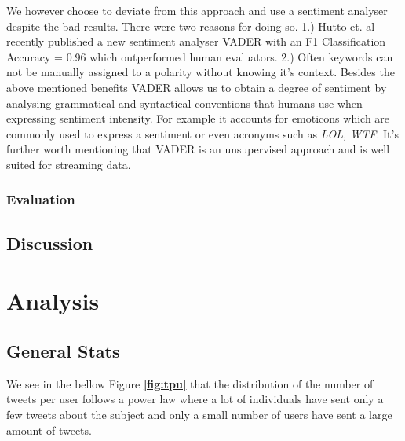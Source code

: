 \documentclass[12pt]{report}
\begin{document}
We however choose to deviate from this approach and use a sentiment analyser despite the bad results. There were two reasons for doing so. 1.) Hutto et. al recently published a new sentiment analyser VADER \cite{hutton14} with an F1 Classification Accuracy = 0.96 which  outperformed human evaluators. 2.) Often keywords can not be manually assigned to a polarity without knowing it's context. Besides the above mentioned benefits VADER allows us to obtain a degree of sentiment by analysing grammatical and syntactical conventions that humans use when expressing sentiment intensity. For example it accounts for emoticons which are commonly used to express a sentiment or even acronyms such as \emph{LOL, WTF}. It's further worth mentioning that VADER is an unsupervised approach and is well suited for streaming data. 


\subsection{Evaluation}






\section {Discussion}




\chapter{Analysis}

\section{General Stats}

We see in the bellow Figure \textbf{\ref{fig:tpu}} that the distribution of the number of tweets per user follows a power law where a lot of individuals have sent only a few tweets about the subject and only a small number of users have sent a large amount of tweets. 
\end{document}
